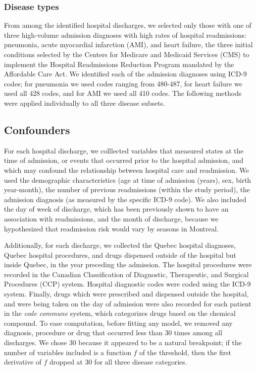\documentclass[]{article}\usepackage[]{graphicx}\usepackage[]{color}
\begin{document}
\subsubsection{Disease types}
From among the identified hospital discharges, we selected only those with one of three high-volume admission diagnoses with high rates of hospital readmissions: pneumonia, acute myocardial infarction (AMI), and heart failure, the three initial conditions selected by the Centers for Medicare and Medicaid Services (CMS) to implement the Hospital Readmissions Reduction Program mandated by the Affordable Care Act. We identified each of the admission diagnoses using ICD-9 codes; for pneumonia we used codes ranging from 480-487, for heart failure we used all 428 codes, and for AMI we used all 410 codes. The following methods were applied individually to all three disease subsets. 


\subsection{Confounders}
For each hospital discharge, we colllected variables that measured states at the time of admission, or events that occurred prior to the hospital admission, and which may confound the relationship between hospital care and readmission. We used the demographic characteristics (age at time of admission (years), sex, birth year-month), the number of previous readmissions (within the study period), the admission diagnosis (as measured by the specific ICD-9 code). We also included the day of week of discharge, which has been previously shown to have an association with readmissions, and the month of discharge, because we hypothesized that readmission risk would vary by seasons in Montreal.

Additionally, for each discharge, we collected the Quebec hospital diagnoses, Quebec hospital procedures, and drugs dispensed outside of the hospital but inside Quebec, in the year preceding the admission. The hospital procedures were recorded in the Canadian Classification of Diagnostic, Therapeutic, and Surgical Procedures (CCP) system. Hospital diagnostic codes were coded using the ICD-9 system. Finally, drugs which were prescribed and dispensed outside the hospital, and were being taken on the day of admission were also recorded for each patient in the \emph{code commune} system, which categorizes drugs based on the chemical compound. To ease computation, before fitting any model, we removed any diagnosis, procedure or drug that occurred less than 30 times among all discharges. We chose 30 because it appeared to be a natural breakpoint; if the number of variables included is a function $f$ of the threshold, then the first derivative of $f$ dropped at 30 for all three disease categories.
\end{document}
